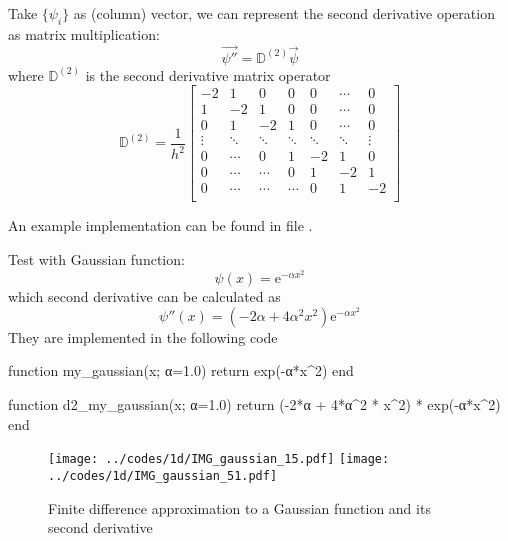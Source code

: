 Take $\{ \psi_{i} \}$ as (column) vector, we can represent the second derivative operation
as matrix multiplication:
\begin{equation}
\vec{\psi''} = \mathbb{D}^{(2)} \vec{\psi}
\end{equation}
where $\mathbb{D}^{(2)}$ is the second derivative matrix operator
\begin{equation}
\mathbb{D}^{(2)} = \frac{1}{h^2}
\begin{bmatrix}
-2  &  1  &  0  &  0  & 0 & \cdots & 0 \\
 1  & -2  &  1  &  0  & 0 & \cdots & 0 \\
 0  &  1  & -2  &  1  & 0 & \cdots & 0 \\
 \vdots  &  \ddots  &  \ddots  & \ddots  & \ddots  & \ddots & \vdots \\
 0 & \cdots & 0 & 1 & -2 & 1 & 0 \\
 0  &  \cdots  & \cdots & 0  & 1  & -2  & 1 \\
 0  &  \cdots  & \cdots & \cdots & 0  &  1  & -2 \\
\end{bmatrix}
\end{equation}

An example implementation can be found in file .


Test with Gaussian function:
\begin{equation}
\psi(x) = \mathrm{e}^{-\alpha x^2}
\end{equation}
%
which second derivative can be calculated as
%
\begin{equation}
\psi''(x) = \left( -2 \alpha + 4\alpha^2 x^2 \right) \mathrm{e}^{-\alpha x^2}
\end{equation}
%
They are implemented in the following code
\begin{juliacode}
function my_gaussian(x; α=1.0)
    return exp(-α*x^2)
end

function d2_my_gaussian(x; α=1.0)
    return (-2*α + 4*α^2 * x^2) * exp(-α*x^2)
end
\end{juliacode}

\begin{figure}[H]
{\center
\texttt{[image: ../codes/1d/IMG\_gaussian\_15.pdf]}
\texttt{[image: ../codes/1d/IMG\_gaussian\_51.pdf]}
\par}
\caption{Finite difference approximation to a Gaussian function and its second derivative}
\end{figure}


